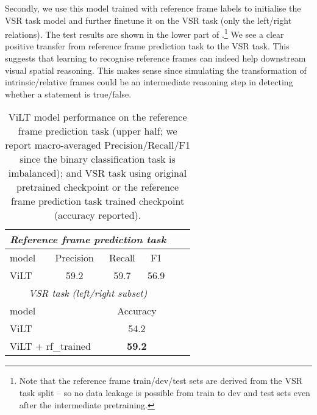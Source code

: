 Secondly, we use this model trained with reference frame labels to initialise the VSR task model and further finetune it on the VSR task (only the left/right relations). The test results are shown in the lower part of .\footnote{Note that the reference frame train/dev/test sets are derived from the VSR task split -- so no data leakage is possible from train to dev and test sets even after the intermediate pretraining.} We see a clear positive transfer from reference frame prediction task to the VSR task.
This suggests that learning to recognise reference frames can indeed help downstream visual spatial reasoning. This makes sense since simulating the transformation of intrinsic/relative frames could be an intermediate reasoning step in detecting whether a statement is true/false.


\begin{table}[]
\centering
\small
\begin{tabular}{lccccc}
\toprule
\multicolumn{4}{c}{\emph{Reference frame prediction task}} \\
\midrule
model & Precision & Recall & F1  \\
\midrule
ViLT & 59.2 & 59.7 & 56.9 \\
\toprule
\multicolumn{4}{c}{\emph{VSR task (left/right subset)}} \\
\midrule
model &  & \multicolumn{2}{c}{Accuracy} \\
\midrule
\multicolumn{2}{l}{ViLT} & \multicolumn{2}{c}{54.2} \\
\multicolumn{2}{l}{ViLT + rf\_trained} &  \multicolumn{2}{c}{\textbf{59.2}} \\
\bottomrule
\end{tabular}
\caption{ViLT model performance on the reference frame prediction task (upper half; we report macro-averaged Precision/Recall/F1 since the binary classification task is imbalanced); and VSR task using original pretrained checkpoint or the reference frame prediction task trained checkpoint (accuracy reported).}
\label{table:rf}
\end{table}


